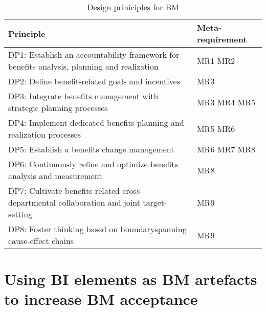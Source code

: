\begin{table}[H]
 \begin{tabular}{|p{12cm}|p{2cm}|}
  \hline
\textbf{Principle}		& \textbf{Meta-requirement}\\
    \hline  
DP1: Establish an accountability framework for benefits analysis, planning and realization 
& 
MR1
\newline
MR2
\\
\hline

DP2: Define benefit-related goals and incentives 
& 
MR3
\\
\hline

DP3: Integrate benefits management with strategic planning processes
&
MR3
\newline
MR4
\newline
MR5
\\
\hline

DP4: Implement dedicated benefits planning and realization processes
&
MR5
\newline
MR6
\\
\hline

DP5: Establish a benefits change management
&
MR6
\newline
MR7
\newline
MR8
\\
\hline

DP6: Continuously refine and optimize benefits analysis and measurement
&
MR8
\\
\hline

DP7: Cultivate benefits-related cross-departmental collaboration and joint target-setting
&
MR9
\\
\hline

DP8: Foster thinking based on boundaryspanning cause-effect chains
&
MR9
\\
\hline


\hline
  \end{tabular}
  \caption{Design priniciples for BM \citep[p.8f.]{ahlemann_exploiting_2013}}
	\label{design_principles_bm}
\end{table}

\section{Using BI elements as BM artefacts to increase BM acceptance}
\label{bi_elements_higher_acceptance}


